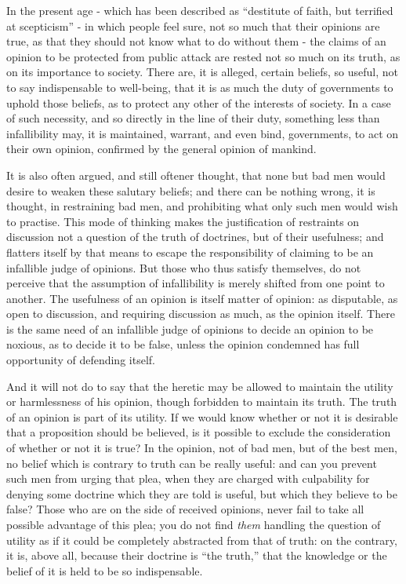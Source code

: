 In the present age - which has been described as “destitute of faith, but terrified at scepticism” - in which people feel sure, not so much that their opinions are true, as that they should not know what to do without them - the claims of an opinion to be protected from public attack are rested not so much on its truth, as on its importance to society. There are, it is alleged, certain beliefs, so useful, not to say indispensable to well-being, that it is as much the duty of governments to uphold those beliefs, as to protect any other of the interests of society. In a case of such necessity, and so directly in the line of their duty, something less than infallibility may, it is maintained, warrant, and even bind, governments, to act on their own opinion, confirmed by the general opinion of mankind.\par

It is also often argued, and still oftener thought, that none but bad men would desire to weaken these salutary beliefs; and there can be nothing wrong, it is thought, in restraining bad men, and prohibiting what only such men would wish to practise. This mode of thinking makes the justification of restraints on discussion not a question of the truth of doctrines, but of their usefulness; and flatters itself by that means to escape the responsibility of claiming to be an infallible judge of opinions. But those who thus satisfy themselves, do not perceive that the assumption of infallibility is merely shifted from one point to another. The usefulness of an opinion is itself matter of opinion: as disputable, as open to discussion, and requiring discussion as much, as the opinion itself. There is the same need of an infallible judge of opinions to decide an opinion to be noxious, as to decide it to be false, unless the opinion condemned has full opportunity of defending itself.\par

And it will not do to say that the heretic may be allowed to maintain the utility or harmlessness of his opinion, though forbidden to maintain its truth. The truth of an opinion is part of its utility. If we would know whether or not it is desirable that a proposition should be believed, is it possible to exclude the consideration of whether or not it is true? In the opinion, not of bad men, but of the best men, no belief which is contrary to truth can be really useful: and can you prevent such men from urging that plea, when they are charged with culpability for denying some doctrine which they are told is useful, but which they believe to be false? Those who are on the side of received opinions, never fail to take all possible advantage of this plea; you do not find \textit{them} handling the question of utility as if it could be completely abstracted from that of truth: on the contrary, it is, above all, because their doctrine is “the truth,” that the knowledge or the belief of it is held to be so indispensable.\par

